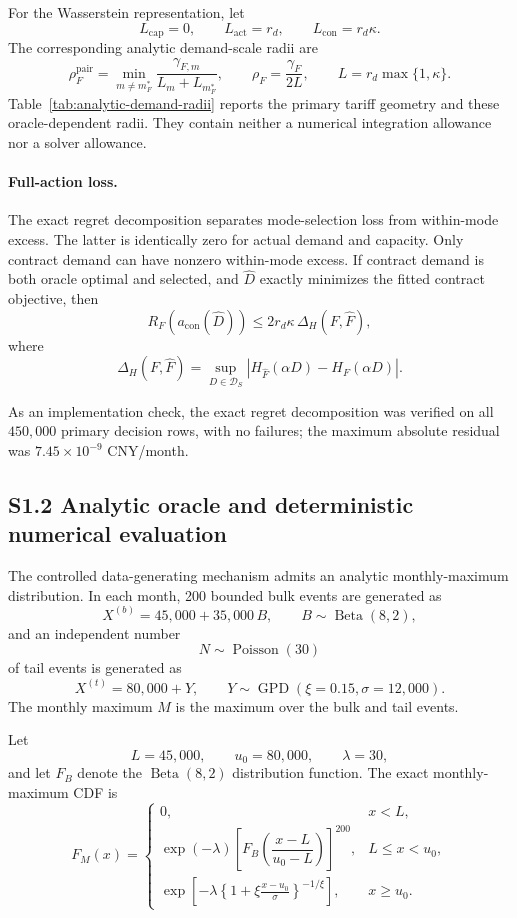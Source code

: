 \documentclass[AMA,Times1COL]{WileyNJDv5}
\begin{document}
For the Wasserstein representation, let
\[
L_{\mathrm{cap}}=0,\qquad
L_{\mathrm{act}}=r_d,\qquad
L_{\mathrm{con}}=r_d\kappa.
\]
The corresponding analytic demand-scale radii are
\[
\rho_F^{\mathrm{pair}}
=\min_{m\neq m_F^\ast}
\frac{\gamma_{F,m}}{L_m+L_{m_F^\ast}},
\qquad
\rho_F=\frac{\gamma_F}{2L},
\qquad
L=r_d\max\{1,\kappa\}.
\]
Table~\ref{tab:analytic-demand-radii} reports the primary tariff
geometry and these oracle-dependent radii. They contain neither a
numerical integration allowance nor a solver allowance.

\paragraph*{Full-action loss.}
The exact regret decomposition separates mode-selection loss from
within-mode excess. The latter is identically zero for actual demand
and capacity. Only contract demand can have nonzero within-mode
excess. If contract demand is both oracle optimal and selected, and
$\widehat D$ exactly minimizes the fitted contract objective, then
\[
R_F\!\left(a_{\mathrm{con}}(\widehat D)\right)
\leq
2r_d\kappa\,\Delta_H(F,\widehat F),
\]
where
\[
\Delta_H(F,\widehat F)
=\sup_{D\in\mathcal D_S}
\left|H_{\widehat F}(\alpha D)-H_F(\alpha D)\right|.
\]

As an implementation check, the exact regret decomposition was
verified on all $450{,}000$ primary decision rows, with no
failures; the maximum absolute residual was
$7.45\times10^{-9}$ CNY/month.



\subsection*{S1.2 Analytic oracle and deterministic numerical evaluation}

The controlled data-generating mechanism admits an analytic
monthly-maximum distribution. In each month, 200 bounded bulk events
are generated as
\[
X^{(b)}
=
45{,}000+35{,}000\,B,
\qquad
B\sim\operatorname{Beta}(8,2),
\]
and an independent number
\[
N\sim\operatorname{Poisson}(30)
\]
of tail events is generated as
\[
X^{(t)}
=
80{,}000+Y,
\qquad
Y\sim\operatorname{GPD}(\xi=0.15,\sigma=12{,}000).
\]
The monthly maximum \(M\) is the maximum over the bulk and tail
events.

Let
\[
L=45{,}000,
\qquad
u_0=80{,}000,
\qquad
\lambda=30,
\]
and let \(F_B\) denote the
\(\operatorname{Beta}(8,2)\) distribution function. The exact
monthly-maximum CDF is
\[
F_M(x)
=
\begin{cases}
0,
&
x<L,
\\[4pt]
\exp(-\lambda)
\left[
F_B\!\left(
\dfrac{x-L}{u_0-L}
\right)
\right]^{200},
&
L\leq x<u_0,
\\[10pt]
\displaystyle
\exp\left[
-\lambda
\left\{
1+\xi\frac{x-u_0}{\sigma}
\right\}^{-1/\xi}
\right],
&
x\geq u_0.
\end{cases}
\]
\end{document}
